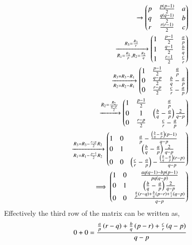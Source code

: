 \documentclass[journal,12pt,twocolumn]{IEEEtran}
\theoremstyle{remark}
\begin{document}
\begin{align}
   \xrightarrow[]{}
    \begin{pmatrix}
        p&\frac{p\left(p-1\right)}{2}&a\\
        q&\frac{q\left(q-1\right)}{2}&b\\
        r&\frac{r\left(r-1\right)}{2}&c\\
    \end{pmatrix}\\
    \xrightarrow[R_{1}=\frac{R_{1}}{p}, R_{2}=\frac{R_{2}}{q}]{R_{3}=\frac{R_{3}}{r}} 
    \begin{pmatrix}
        1&\frac{p-1}{2}&\frac{a}{p}\\
        1&\frac{q-1}{2}&\frac{b}{q}\\
        1&\frac{r-1}{2}&\frac{c}{r}\\
    \end{pmatrix}\\
   \xrightarrow[R_{2}=R_{2}-R_{1}]{R_{3}=R_{3}-R_{1}} 
    \begin{pmatrix}
        1&\frac{p-1}{2}&\frac{a}{p}\\
        0&\frac{q-p}{2}&\frac{b}{q}-\frac{a}{p}\\
        0&\frac{r-p}{2}&\frac{c}{r}-\frac{a}{p}\\
    \end{pmatrix}\\
    \xrightarrow{R_2=\frac{R_{2}}{\frac{q-p}{2}}}
    \begin{pmatrix}
        1&\frac{p-1}{2}&\frac{a}{p}\\
        0&1&\left(\frac{b}{q}-\frac{a}{p}\right)\frac{2}{q-p}\\
        0&\frac{r-p}{2}&\frac{c}{r}-\frac{a}{p}\\
    \end{pmatrix}\\
    \xrightarrow[R_{1}=R_{1}-\frac{p-1}{2}R_{2}]{R_{3}=R_{3}-\frac{r-p}{2}R_{2}}
    \begin{pmatrix}
        1&0&\frac{a}{p}-\frac{\left(\frac{b}{q}-\frac{a}{p}\right)\left(p-1\right)}{q-p}\\
        0&1&\left(\frac{b}{q}-\frac{a}{p}\right)\frac{2}{q-p}\\
        0&0&\left(\frac{c}{r}-\frac{a}{p}\right)-\frac{\left(\frac{b}{q}-\frac{a}{p}\right)\left(r-p\right)}{q-p}\\
    \end{pmatrix}\\
    \implies
    \begin{pmatrix}
        1&0&\frac{aq\left(q-1\right)-bp\left(p-1\right)}{pq\left(q-p\right)}\\
        0&1&\left(\frac{b}{q}-\frac{a}{p}\right)\frac{2}{q-p}\\
        0&0&\frac{\frac{a}{p}\left(r-q\right)+\frac{b}{q}\left(p-r\right)+\frac{c}{r}\left(q-p\right)}{q-p}\\
    \end{pmatrix}
\end{align}
Effectively the third row of the matrix can be written as,
\begin{align}
    0+0=\frac{\frac{a}{p}\left(r-q\right)+\frac{b}{q}\left(p-r\right)+\frac{c}{r}\left(q-p\right)}{q-p}
\end{align}
\end{document}
